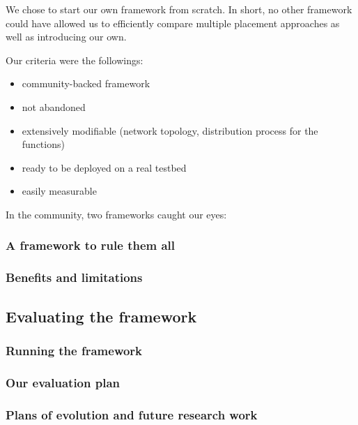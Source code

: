 \documentclass[11pt]{sdm}
\begin{document}
We chose to start our own framework from scratch. In short, no other framework could have allowed us to efficiently compare multiple placement approaches as well as introducing our own.

Our criteria were the followings:
\begin{itemize}
	\item community-backed framework
	\item not abandoned
	\item extensively modifiable (network topology, distribution process for the functions)
	\item ready to be deployed on a real testbed
	\item easily measurable
\end{itemize}

In the community, two frameworks caught our eyes:
\begin{description}
	\item[\cite{deng_fogbus2_2021}]{
	}
	\item[\cite{smartfog_fogflow_2022}]{}
\end{description}

\subsubsection{A framework to rule them all}

\subsubsection{Benefits and limitations}

\subsection{Evaluating the framework}

\subsubsection{Running the framework}

\subsubsection{Our evaluation plan}

\subsubsection{Plans of evolution and future research work}
\end{document}
